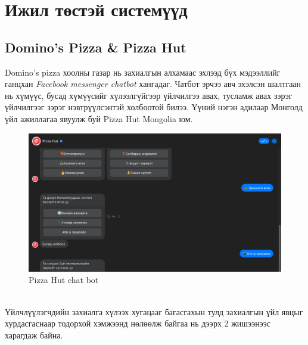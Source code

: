 \section{Ижил төстэй системүүд}
\subsection{Domino's Pizza \& Pizza Hut}
Domino's pizza хоолны газар нь захиалгын алхамаас эхлээд бүх мэдээллийг ганцхан \textit{Facebook messenger chatbot} хангадаг. Чатбот эрчээ авч эхэлсэн шалтгаан нь хүмүүс, бусад хүмүүсийг хүлээлгүйгээр үйлчилгээ авах, тусламж авах зэрэг үйлчилгээг зэрэг нэвтрүүлсэнтэй холбоотой билээ. Үүний нэгэн адилаар Монголд үйл ажиллагаа явуулж буй Pizza Hut Mongolia юм.
\begin{figure}[h]
  \centering
  \includegraphics[width=\textwidth]{images/pizzaHut.png}
  \caption{Pizza Hut chat bot}
\end{figure}
\\Үйлчлүүлэгчдийн захиалга хүлээх хугацааг багасгахын тулд захиалгын үйл явцыг хурдасгаснаар тодорхой хэмжээнд нөлөөлж байгаа нь дээрх 2 жишээнээс харагдаж байна.

